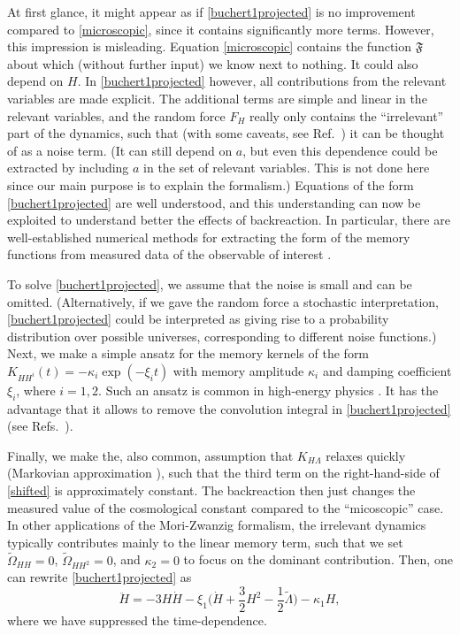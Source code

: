 \documentclass[aps,prl,11pt,nofootinbib]{revtex4-1}
\newcommand{\ZT}[1]{\textquotedblleft#1\textquotedblright}%
\begin{document}
At first glance, it might appear as if \cref{buchert1projected} is no improvement compared to \cref{microscopic}, since it contains significantly more terms. However, this impression is misleading. Equation \eqref{microscopic} contains the function $\mathfrak{F}$ about which (without further input) we know next to nothing. It could also depend on $H$. In \cref{buchert1projected} however, all contributions from the relevant variables are made explicit. The additional terms are simple and linear in the relevant variables, and the random force $F_H$ really only contains the \ZT{irrelevant} part of the dynamics, such that (with some caveats, see Ref.\ \cite{EspanolO1993}) it can be thought of as a noise term. (It can still depend on $a$, but even this dependence could be extracted by including $a$ in the set of relevant variables. This is not done here since our main purpose is to explain the formalism.) Equations of the form \eqref{buchert1projected} are well understood, and this understanding can now be exploited to understand better the effects of backreaction. In particular, there are well-established numerical methods for extracting the form of the memory functions from measured data of the observable of interest \cite{MeyerPS2020,MeyerWSS2020,BerkowitzMKM1981}.

To solve \cref{buchert1projected}, we assume that the noise is small and can be omitted. (Alternatively, if we gave the random force a stochastic interpretation, \cref{buchert1projected} could be interpreted as giving rise to a probability distribution over possible universes, corresponding to different noise functions.) Next, we make a simple ansatz for the memory kernels of the form $K_{HH^i}(t)= - \kappa_i \exp(-\xi_i t)$ with memory amplitude $\kappa_i$ and damping coefficient $\xi_i$, where $i=1,2$. Such an ansatz is common in high-energy physics \cite{KoideKR2006,KoideDMK2007}. It has the advantage that it allows to remove the convolution integral in \cref{buchert1projected} (see Refs.\ \cite{KoideKR2006,teVrugtJW2021}). 

Finally, we make the, also common, assumption that $K_{H\Lambda}$ relaxes quickly (Markovian approximation \cite{RauM1996}), such that the third term on the right-hand-side of \cref{shifted} is approximately constant. The backreaction then just changes the measured value of the cosmological constant compared to the \ZT{micoscopic} case. In other applications of the Mori-Zwanzig formalism, the irrelevant dynamics typically contributes mainly to the linear memory term, such that we set $\tilde{\Omega}_{HH}=0$, $\tilde{\Omega}_{HH^2}=0$, and $\kappa_2=0$ to focus on the dominant contribution. Then, one can rewrite \cref{buchert1projected} as
\begin{equation}
\ddot{H}=-3H\dot{H} -\xi_1\bigg(\dot{H}+\frac{3}{2}H^2-\frac{1}{2}\tilde{\Lambda}\bigg)- \kappa_1 H, \label{eins}
\end{equation}
where we have suppressed the time-dependence.
\end{document}
